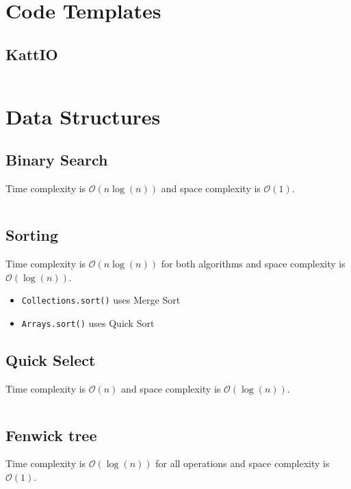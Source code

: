 \documentclass[8pt,a4paper,landscape,oneside]{amsart}
\newcommand{\code}[1]{\inputminted[fontsize=\normalsize,baselinestretch=1]{java}{code/#1}}
\newcommand{\bigO}{\mathcal{O}}
\begin{document}
\begin{multicols*}{3}
\thispagestyle{fancy}
\vspace{-3em}

\tableofcontents
\section{Code Templates}
  \subsection{KattIO}
  \code{Kattio.java}
  
\section{Data Structures}
  \subsection{Binary Search}
  Time complexity is $\bigO(n \log(n))$ and space complexity is $\bigO(1)$.
  \code{Structures/BinarySearch.java}
  \subsection{Sorting}
  Time complexity is $\bigO(n \log(n))$ for both algorithms and space complexity is $\bigO(\log(n))$.
  \begin{itemize}
  \item \texttt{Collections.sort()} uses Merge Sort
  \item \texttt{Arrays.sort()} uses Quick Sort
  \end{itemize}
  
  \subsection{Quick Select}
  Time complexity is $\bigO(n)$ and space complexity is $\bigO(\log(n))$.
  \code{Structures/QuickSelect.java}
  
  \subsection{Fenwick tree}
  Time complexity is $\bigO(\log(n))$ for all operations and space complexity is $\bigO(1)$.
  \code{Structures/Fenwick.java}
  

\end{multicols*}
\end{document}
